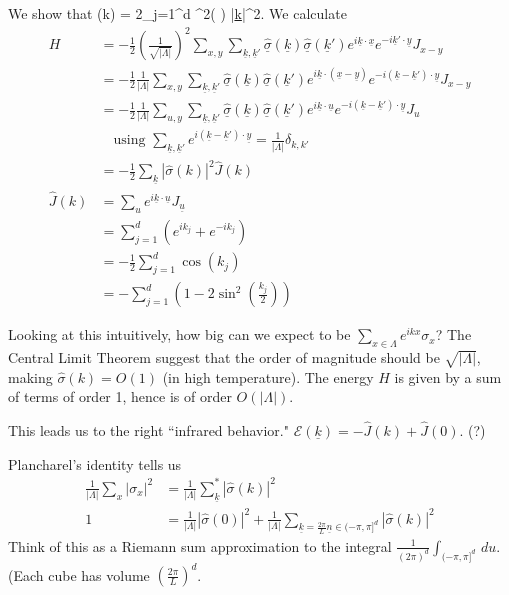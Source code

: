 We show that
\be
\widehat{\underline{\sigma}}(k) = 2\sum_{j=1}^{d} \sin^2\left( {} \right) \approx {} |\underline{k}|^2.
\ee
We calculate
\begin{align}
H &= -\frac{1}{2}\left( {\frac{1}{\sqrt{|\Lambda|}}} \right)^2\sum_{x,y} \sum_{\underline{k}, \underline{k}'} \widehat{\underline{\sigma}}(\underline{k})\widehat{\underline{\sigma}}(\underline{k}') e^{i\underline{k}\cdot \underline{x}} e^{-i\underline{k}'\cdot \underline{y}}J_{x-y}\\
&=-\frac{1}{2}\frac{1}{|\Lambda|}  
\sum_{x,y} \sum_{\underline{k}, \underline{k}'} \widehat{\underline{\sigma}}(\underline{k})\widehat{\underline{\sigma}}(\underline{k}') e^{i\underline{k}\cdot (\underline{x}-\underline{y})} e^{-i(\underline{k}-\underline{k}')\cdot \underline{y}}J_{x-y}\\
&=-\frac{1}{2}\frac{1}{|\Lambda|} \sum_{u,y} \sum_{\underline{k}, \underline{k}'} \widehat{\underline{\sigma}}(\underline{k})\widehat{\underline{\sigma}}(\underline{k}') e^{i\underline{k}\cdot \underline{u}} e^{-i(\underline{k}-\underline{k}')\cdot \underline{y}}J_{u}\\
&\quad \text{using }\sum_{\underline{k},\underline{k}'} e^{i(\underline{k}-\underline{k}')\cdot\underline{y}} = \frac{1}{|\Lambda|} \delta_{k,k'}\\
&=-\frac{1}{2}\sum_{\underline{k}} |\widehat{\sigma}(k)|^2 \widehat{J}(k)\\
\widehat{J}(k) &= \sum_u e^{i\underline{k}\cdot \underline{u}} J_{\underline{u}} \\
&=\sum_{j=1}^{d} (e^{ik_j}+e^{-ik_j})\\
&=%
-\frac{1}{2} \sum_{j=1}^{d} \cos(k_j)\\
&= -\sum_{j=1}^{d} \left( {1-2\sin^2\left( {\frac{k_j}{2}} \right)} \right)
\end{align}

Looking at this intuitively, %
how big can we expect to be $\sum_{x\in \Lambda} e^{ikx}\sigma_x$? The Central Limit Theorem suggest that the order of magnitude should be $\sqrt{|\Lambda|}$, making $\widehat{\sigma}(k)=O(1)$ (in high temperature). The energy $H$ is given by a sum of terms of order 1, hence is of order $O(|\Lambda|)$. 

This leads us to the right ``infrared behavior." $\mathcal{E}(\underline{k}) = -\widehat{J}(k) + \widehat{J}(0)$. (?)

Plancharel's identity tells us
\begin{align}
\frac{1}{|\Lambda|}\sum_x |\sigma_x|^2 &= 
\frac{1}{|\Lambda|}\sum_{\underline{k}}^* |\widehat{\sigma}(k)|^2\\
1 &= \frac{1}{|\Lambda|}|\widehat{\sigma}(0)|^2 + \frac{1}{|\Lambda|} \sum_{\underline{k} = \frac{2\pi}{L} \underline{n}\in (-\pi, \pi]^d}|\widehat{\sigma}(k)|^2
\end{align}
Think of this as a Riemann sum approximation to the integral $\frac{1}{(2\pi)^d}\int_{(-\pi,\pi]^d}\,du$. (Each cube has volume $\left( {\frac{2\pi}{L}} \right)^d$.

